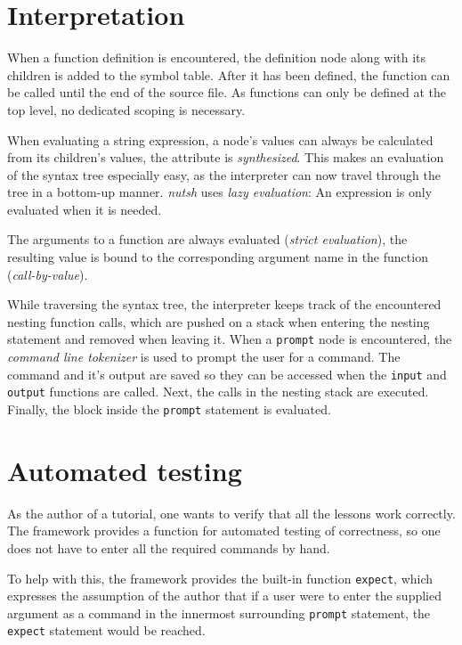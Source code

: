 \documentclass[paper=a4,twoside,abstract=on,cleardoublepage=empty,numbers=noenddot,toc=bib,12pt,appendixprefix=true]{scrreprt}
\begin{document}

\section{Interpretation}

When a function definition is encountered, the definition node along with its children is added to the symbol table. After it has been defined, the function can be called until the end of the source file. As functions can only be defined at the top level, no dedicated scoping is necessary.

When evaluating a string expression, a node's values can always be calculated from its children's values, the attribute is \emph{synthesized}. This makes an evaluation of the syntax tree especially easy, as the interpreter can now travel through the tree in a bottom-up manner. \emph{nutsh} uses \emph{lazy evaluation}: An expression is only evaluated when it is needed.

The arguments to a function are always evaluated (\emph{strict evaluation}), the resulting value is bound to the corresponding argument name in the function (\emph{call-by-value}).

While traversing the syntax tree, the interpreter keeps track of the encountered nesting function calls, which are pushed on a stack when entering the nesting statement and removed when leaving it. When a \texttt{prompt} node is encountered, the \emph{command line tokenizer} is used to prompt the user for a command. The command and it's output are saved so they can be accessed when the \texttt{input} and \texttt{output} functions are called. Next, the calls in the nesting stack are executed. Finally, the block inside the \texttt{prompt} statement is evaluated.
%
%

\section{Automated testing}
\label{sec:testing}

As the author of a tutorial, one wants to verify that all the lessons work correctly. The framework provides a function for automated testing of correctness, so one does not have to enter all the required commands by hand.

To help with this, the framework provides the built-in function \texttt{expect}, which expresses the assumption of the author that if a user were to enter the supplied argument as a command in the innermost surrounding \texttt{prompt} statement, the \texttt{expect} statement would be reached.
\end{document}
